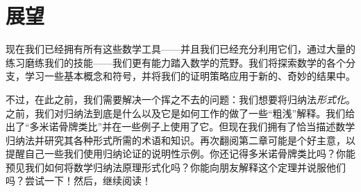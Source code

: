\section{展望}

现在我们已经拥有所有这些数学工具——并且我们已经充分利用它们，通过大量的练习磨练我们的技能——我们更有能力踏入数学的荒野。我们将探索数学的各个分支，学习一些基本概念和符号，并将我们的证明策略应用于新的、奇妙的结果中。

不过，在此之前，我们需要解决一个挥之不去的问题：我们想要将归纳法\emph{形式化}。之前，我们对归纳法到底是什么以及它是如何工作的做了一些``粗浅''解释。我们给出了``多米诺骨牌类比''并在一些例子上使用了它。但现在我们拥有了恰当描述数学归纳法并研究其各种形式所需的术语和知识。再次翻阅第二章可能是个好主意，以提醒自己一些我们使用归纳论证的说明性示例。你还记得多米诺骨牌类比吗？你能预见我们如何将数学归纳法原理形式化吗？你能向朋友解释这个定理并说服他们吗？尝试一下！然后，继续阅读！